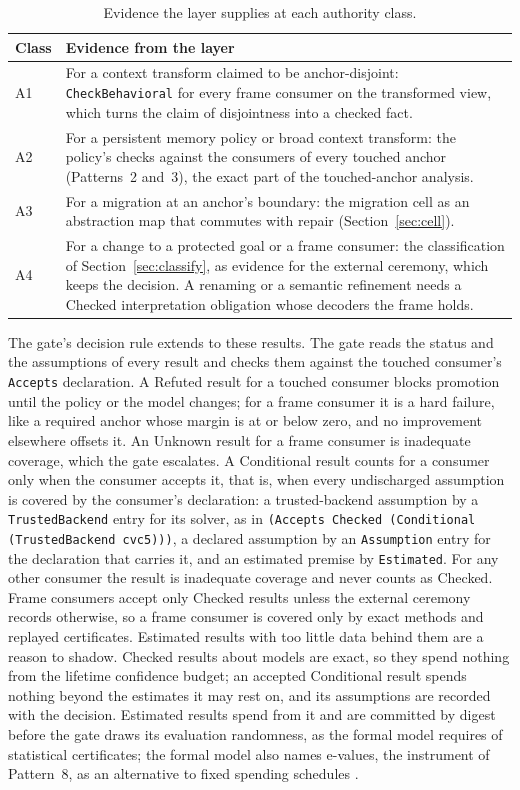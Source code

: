 \documentclass[11pt]{article}
\newcommand{\code}[1]{\texttt{#1}}
\theoremstyle{definition}
\theoremstyle{plain}
\begin{document}
\begin{table}[ht]
\centering\small
\begin{tabularx}{\textwidth}{lX}
\toprule
Class & Evidence from the layer\\
\midrule
A1 & For a context transform claimed to be anchor-disjoint: \code{CheckBehavioral} for every frame
consumer on the transformed view, which turns the claim of disjointness into a checked fact.\\
A2 & For a persistent memory policy or broad context transform: the policy's checks against the
consumers of every touched anchor (Patterns~2 and~3), the exact part of the touched-anchor
analysis.\\
A3 & For a migration at an anchor's boundary: the migration cell as an abstraction map that
commutes with repair (Section~\ref{sec:cell}).\\
A4 & For a change to a protected goal or a frame consumer: the classification of
Section~\ref{sec:classify}, as evidence for the external ceremony, which keeps the decision. A
renaming or a semantic refinement needs a Checked interpretation obligation whose decoders the
frame holds.\\
\bottomrule
\end{tabularx}
\caption{Evidence the layer supplies at each authority class.}\label{tab:gate}
\end{table}

The gate's decision rule extends to these results. The gate reads the status and the assumptions
of every result and checks them against the touched consumer's \code{Accepts} declaration. A
Refuted result for a touched consumer blocks promotion until the policy or the model changes; for a
frame consumer it is a hard failure, like a required anchor whose margin is at or below zero, and
no improvement elsewhere offsets it. An Unknown result for a frame consumer is inadequate coverage,
which the gate escalates. A Conditional result counts for a consumer only when the consumer accepts
it, that is, when every undischarged assumption is covered by the consumer's declaration: a
trusted-backend assumption by a \code{TrustedBackend} entry for its solver, as in
\code{(Accepts Checked (Conditional (TrustedBackend cvc5)))}, a declared assumption by an
\code{Assumption} entry for the declaration that carries it, and an estimated premise by
\code{Estimated}. For any other consumer the result is inadequate coverage and never counts as
Checked. Frame consumers
accept only Checked results unless the external ceremony records otherwise, so a frame consumer is
covered only by exact methods and replayed certificates. Estimated results with too little data
behind them are a reason to shadow. Checked results about models are exact, so they spend nothing
from the lifetime confidence budget; an accepted Conditional result spends nothing beyond the
estimates it may rest on, and its assumptions are recorded with the decision. Estimated results spend from it and are
committed by digest before the gate draws its evaluation randomness, as the formal model requires
of statistical certificates; the formal model also names e-values, the instrument of Pattern~8, as
an alternative to fixed spending schedules \cite{golemformal}.
\end{document}
